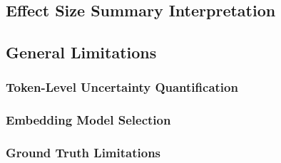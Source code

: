 \subsection{Effect Size Summary Interpretation}
\label{sec:discussion_effect_sizes}


\subsection{General Limitations}
\label{sec:discussion_limitations}


\subsubsection{Token-Level Uncertainty Quantification}

\subsubsection{Embedding Model Selection}

\subsubsection{Ground Truth Limitations}

